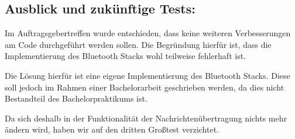 \clearpage\subsection{Ausblick und zukünftige
Tests:}\label{ausblick-und-zukuxfcnftige-tests}

Im Auftragsgebertreffen wurde entschieden, dass keine weiteren
Verbesserungen am Code durchgeführt werden sollen. Die Begründung
hierfür ist, dass die Implementierung des Bluetooth Stacks wohl
teilweise fehlerhaft ist.

Die Lösung hierfür ist eine eigene Implementierung des Bluetooth Stacks.
Diese soll jedoch im Rahmen einer Bachelorarbeit geschrieben werden, da
dies nicht Bestandteil des Bachelorpraktikums ist.

Da sich deshalb in der Funktionalität der Nachrichtenübertragung nichts
mehr ändern wird, haben wir auf den dritten Großtest verzichtet.
